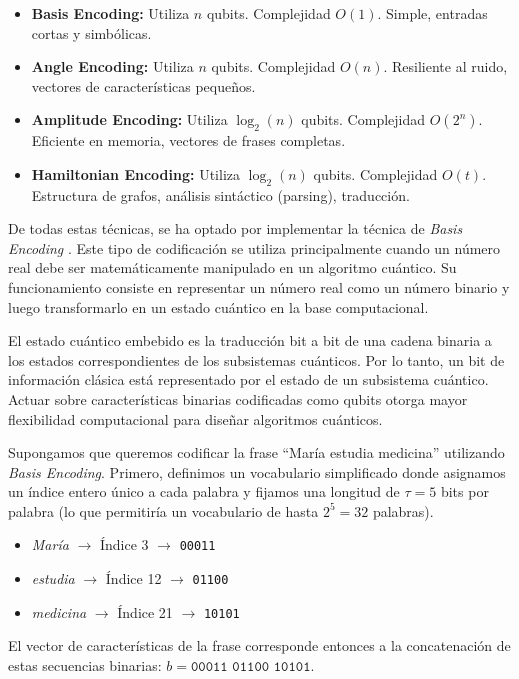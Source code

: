\begin{itemize}
  \item \textbf{Basis Encoding:} Utiliza $n$ qubits. Complejidad $O(1)$. Simple, entradas cortas y simbólicas.
  \item \textbf{Angle Encoding:} Utiliza $n$ qubits. Complejidad $O(n)$. Resiliente al ruido, vectores de características pequeños.
  \item \textbf{Amplitude Encoding:} Utiliza $\log_2(n)$ qubits. Complejidad $O(2^n)$. Eficiente en memoria, vectores de frases completas.
  \item \textbf{Hamiltonian Encoding:} Utiliza $\log_2(n)$ qubits. Complejidad $O(t)$. Estructura de grafos, análisis sintáctico (parsing), traducción.
\end{itemize}

De todas estas técnicas, se ha optado por implementar la técnica de \textit{Basis Encoding} \cite{quantumzeitgeist_encoding_overview}. Este tipo de codificación se utiliza principalmente cuando un número real debe ser matemáticamente manipulado en un algoritmo cuántico. Su funcionamiento consiste en representar un número real como un número binario y luego transformarlo en un estado cuántico en la base computacional.

El estado cuántico embebido es la traducción bit a bit de una cadena binaria a los estados correspondientes de los subsistemas cuánticos. Por lo tanto, un bit de información clásica está representado por el estado de un subsistema cuántico. Actuar sobre características binarias codificadas como qubits otorga mayor flexibilidad computacional para diseñar algoritmos cuánticos.

Supongamos que queremos codificar la frase ``María estudia medicina'' utilizando \textit{Basis Encoding}. Primero, definimos un vocabulario simplificado donde asignamos un índice entero único a cada palabra y fijamos una longitud de $\tau = 5$ bits por palabra (lo que permitiría un vocabulario de hasta $2^5 = 32$ palabras).

\begin{itemize}
  \item \textit{María} $\rightarrow$ Índice 3 $\rightarrow$ \texttt{00011}
  \item \textit{estudia} $\rightarrow$ Índice 12 $\rightarrow$ \texttt{01100}
  \item \textit{medicina} $\rightarrow$ Índice 21 $\rightarrow$ \texttt{10101}
\end{itemize}

El vector de características de la frase corresponde entonces a la concatenación de estas secuencias binarias: $b = \texttt{00011 01100 10101}$.

